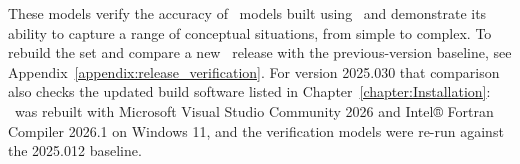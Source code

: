\label{chapter:ModelVerification}
These models verify the accuracy of \mfus\ models built using \mut\ and demonstrate its ability to capture a range of conceptual situations, from simple to complex. To rebuild the set and compare a new \mut\ release with the previous-version baseline, see Appendix~\ref{appendix:release_verification}. For version 2025.030 that comparison also checks the updated build software listed in Chapter~\ref{chapter:Installation}: \mut\ was rebuilt with Microsoft Visual Studio Community 2026 and Intel® Fortran Compiler 2026.1 on Windows 11, and the verification models were re-run against the 2025.012 baseline.
